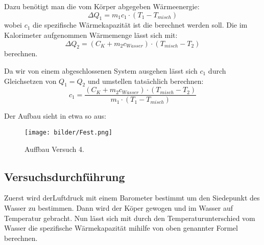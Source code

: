 	Dazu benötigt man die vom Körper abgegeben Wärmeenergie:
	$$\Delta Q_{1} = m_{1}c_{1} \cdot (T_{1} - T_{misch})$$
	wobei $c_{1}$ die spezifische Wärmekapazität ist die berechnet werden soll. Die im Kalorimeter aufgenommen Wärmemenge lässt sich mit:
	$$\Delta Q_{2} = (C_{K} + m_{2}c_{Wasser}) \cdot (T_{misch} - T_{2})$$
	berechnen.
	
	Da wir von einem abgeschlossenen System ausgehen lässt sich $c_{1}$ durch Gleichsetzen von $Q_{1} = Q_{2}$ und umstellen tatsächlich berechnen:
	$$c_{1} = \frac{(C_{K} +m_{2}c_{Wasser}) \cdot (T_{misch} - T_{2})}{m_{1} \cdot (T_{1} - T_{misch})}$$
	
	Der Aufbau sieht in etwa so aus:
	       	\begin{figure}[ht]
		\label{fig:abb4}
		\begin{center}
			\texttt{[image: bilder/Fest.png]}
			\caption{Auffbau Versuch 4.}
		\end{center}
	\end{figure}
    \subsection{Versuchsdurchführung}
  Zuerst wird derLuftdruck mit einem Barometer bestimmt um den Siedepunkt des Wasser zu bestimmen. Dann wird der Köper gewogen und im Wasser auf Temperatur gebracht.  Nun lässt sich mit durch den Temperaturunterschied vom Wasser die spezifische Wärmekapazität mihilfe von oben genannter Formel berechnen. 
